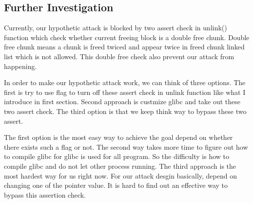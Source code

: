 \documentclass[12pt]{article}
\begin{document}
\subsection{Further Investigation}

Currently, our hypothetic attack is blocked by two assert check in unlink() function which check whether current freeing block is a double free chunk. Double free chunk means a chunk is freed twiced and appear twice in freed chunk linked list which is not allowed. This double free check also prevent our attack from happening. 

In order to make our hypothetic attack work, we can think of three options. The first is try to use flag to turn off these assert check in unlink function like what I introduce in first section. Second approach is custmize glibc and take out these two assert check. The third option is that we keep think way to bypass these two assert.

The first option is the most easy way to achieve the goal depend on whether there exists such a flag or not. The second way takes more time to figure out how to compile glibc for glibc is used for all program. So the difficulty is how to compile glibc and do not let other process running. The third approach is the most hardest way for us right now. For our attack desgin basically, depend on changing one of the pointer value. It is hard to find out an effective way to bypass this assertion check. 
\end{document}
